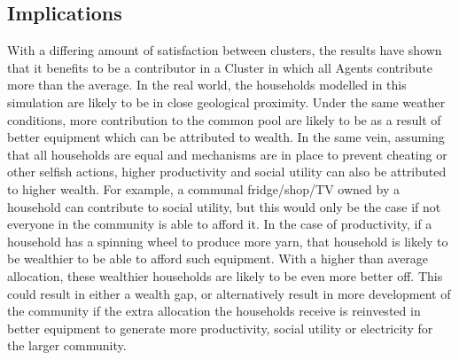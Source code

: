 \subsection*{Implications}
With a differing amount of satisfaction between clusters, the results have shown that it benefits to be a contributor in a Cluster in which all Agents contribute more than the average. In the real world, the households modelled in this simulation are likely to be in close geological proximity. Under the same weather conditions, more contribution to the common pool are likely to be as a result of better equipment which can be attributed to wealth. In the same vein, assuming that all households are equal and mechanisms are in place to prevent cheating or other selfish actions, higher productivity and social utility can also be attributed to higher wealth. For example, a communal fridge/shop/TV owned by a household can contribute to social utility, but this would only be the case if not everyone in the community is able to afford it. In the case of productivity, if a household has a spinning wheel to produce more yarn, that household is likely to be wealthier to be able to afford such equipment. 
With a higher than average allocation, these wealthier households are likely to be even more better off. This could result in either a wealth gap, or alternatively result in more development of the community if the extra allocation the households receive is reinvested in better equipment to generate more productivity, social utility or electricity for the larger community.

